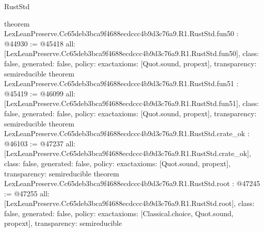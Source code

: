 \begin{lexlean}{RustStd}
\begin{coremodule}
{}
theorem LexLeanPreserve.Cc65deb3bca9f4688ecdccc4b9d3c76a9.R1.RustStd.fun50 : @44930 := @45418 {
  all: [LexLeanPreserve.Cc65deb3bca9f4688ecdccc4b9d3c76a9.R1.RustStd.fun50],
  class: false,
  generated: false,
  policy: exact{axioms: [Quot.sound, propext]},
  transparency: semireducible
}
theorem LexLeanPreserve.Cc65deb3bca9f4688ecdccc4b9d3c76a9.R1.RustStd.fun51 : @45419 := @46099 {
  all: [LexLeanPreserve.Cc65deb3bca9f4688ecdccc4b9d3c76a9.R1.RustStd.fun51],
  class: false,
  generated: false,
  policy: exact{axioms: [Quot.sound, propext]},
  transparency: semireducible
}
theorem LexLeanPreserve.Cc65deb3bca9f4688ecdccc4b9d3c76a9.R1.RustStd.crate_ok : @46103 := @47237 {
  all: [LexLeanPreserve.Cc65deb3bca9f4688ecdccc4b9d3c76a9.R1.RustStd.crate_ok],
  class: false,
  generated: false,
  policy: exact{axioms: [Quot.sound, propext]},
  transparency: semireducible
}
theorem LexLeanPreserve.Cc65deb3bca9f4688ecdccc4b9d3c76a9.R1.RustStd.root : @47245 := @47255 {
  all: [LexLeanPreserve.Cc65deb3bca9f4688ecdccc4b9d3c76a9.R1.RustStd.root],
  class: false,
  generated: false,
  policy: exact{axioms: [Classical.choice, Quot.sound, propext]},
  transparency: semireducible
}


\end{coremodule}
\end{lexlean}
